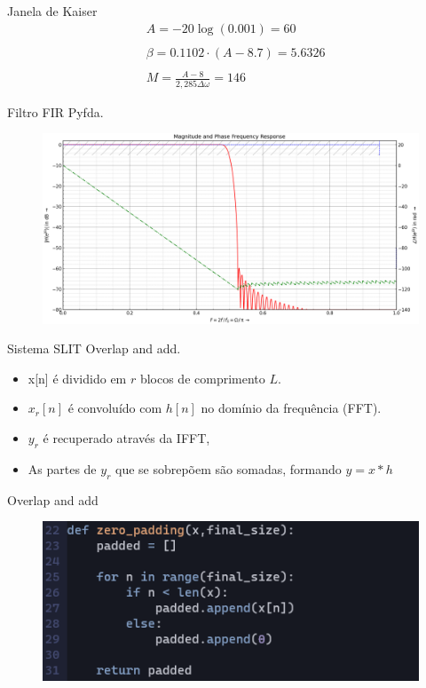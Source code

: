 \documentclass{beamer}
\begin{document}
\begin{frame}{Janela de Kaiser}
     \begin{align*}
         &A = -20\log (0.001) = 60 \\ \\
         &\beta = 0.1102\cdot(A - 8.7) = 5.6326 \\ \\
         &M = \frac{A - 8}{2, 285\Delta \omega} = 146
     \end{align*}
\end{frame}

\begin{frame}{Filtro FIR}
    Pyfda.
    \begin{figure}
        \centering
        \includegraphics[scale=0.33]{filtro_fase.png}
    \end{figure}
\end{frame}

\begin{frame}{Sistema SLIT}
    Overlap and add. \\
    \begin{itemize}
        \item x[n] é dividido em $r$ blocos de comprimento $L$.
        \item $x_r[n]$ é convoluído com $h[n]$ no domínio da frequência (FFT).
        \item $y_r$ é recuperado através da IFFT,
        \item  As partes de $y_r$ que se sobrepõem são somadas, formando $y = x * h$
    \end{itemize}
      
\end{frame}

\begin{frame}{Overlap and add}
     \begin{figure}
         \centering
         \includegraphics[scale = 1.0]{padding.png}
     \end{figure}
\end{frame}
\end{document}
